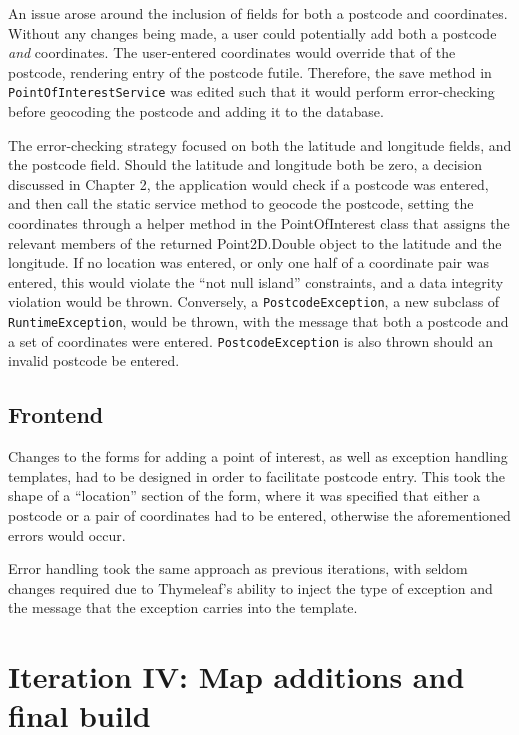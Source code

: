 An issue arose around the inclusion of fields for both a postcode and coordinates. Without any changes being made, a user could potentially add both a postcode \textit{and} coordinates. The user-entered coordinates would override that of the postcode, rendering entry of the postcode futile. Therefore, the save method in \texttt{PointOfInterestService} was edited such that it would perform error-checking before geocoding the postcode and adding it to the database.

The error-checking strategy focused on both the latitude and longitude fields, and the postcode field. Should the latitude and longitude both be zero, a decision discussed in Chapter 2, the application would check if a postcode was entered, and then call the static service method to geocode the postcode, setting the coordinates through a helper method in the PointOfInterest class that assigns the relevant members of the returned Point2D.Double object to the latitude and the longitude. If no location was entered, or only one half of a coordinate pair was entered, this would violate the ``not null island'' constraints, and a data integrity violation would be thrown. Conversely, a \texttt{PostcodeException}, a new subclass of \texttt{RuntimeException}, would be thrown, with the message that both a postcode and a set of coordinates were entered. \texttt{PostcodeException} is also thrown should an invalid postcode be entered.

\subsection{Frontend}

Changes to the forms for adding a point of interest, as well as exception handling templates, had to be designed in order to facilitate postcode entry. This took the shape of a ``location'' section of the form, where it was specified that either a postcode or a pair of coordinates had to be entered, otherwise the aforementioned errors would occur.

Error handling took the same approach as previous iterations, with seldom changes required due to Thymeleaf's ability to inject the type of exception and the message that the exception carries into the template. 


\section{Iteration IV: Map additions and final build}

